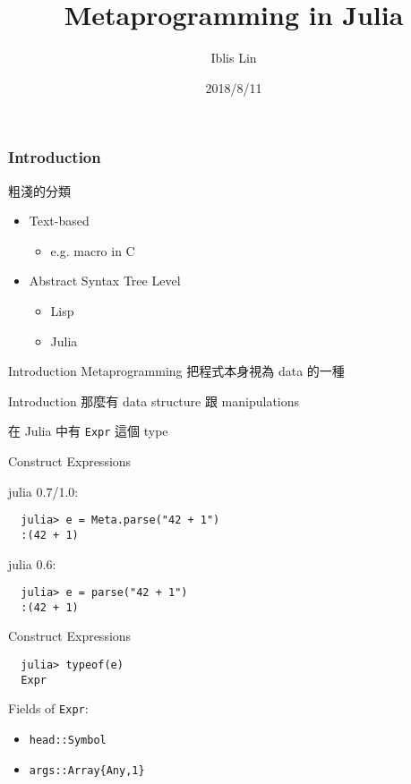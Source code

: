 \documentclass[14pt]{beamer}
\title{Metaprogramming in Julia}
\author{Iblis Lin}
\institute{}
\date{2018/8/11}
\begin{document}
\frame{\titlepage}

\begin{frame}
\frametitle{Introduction}
  粗淺的分類
  \begin{itemize}
    \item Text-based
      \begin{itemize}
        \item e.g. macro in C
      \end{itemize}
    \item Abstract Syntax Tree Level
      \begin{itemize}
        \item Lisp
        \item Julia
      \end{itemize}
  \end{itemize}
\end{frame}


\begin{frame}{Introduction}
  Metaprogramming 把程式本身視為 data 的一種
\end{frame}


\begin{frame}{Introduction}
  那麼有 data structure 跟 manipulations

  \pause
  在 Julia 中有 \alert{\texttt{Expr}} 這個 type
\end{frame}


\begin{frame}[fragile]{Construct Expressions}

julia 0.7/1.0:
\begin{lstlisting}
  julia> e = Meta.parse("42 + 1")
  :(42 + 1)
\end{lstlisting}

julia 0.6:
\begin{lstlisting}
  julia> e = parse("42 + 1")
  :(42 + 1)
\end{lstlisting}
\end{frame}


\begin{frame}[fragile]{Construct Expressions}
\begin{lstlisting}
  julia> typeof(e)
  Expr
\end{lstlisting}

Fields of \texttt{Expr}:
\begin{itemize}
  \item \texttt{head::Symbol}
  \item \texttt{args::Array\{Any,1\}}
\end{itemize}

\end{frame}
\end{document}

